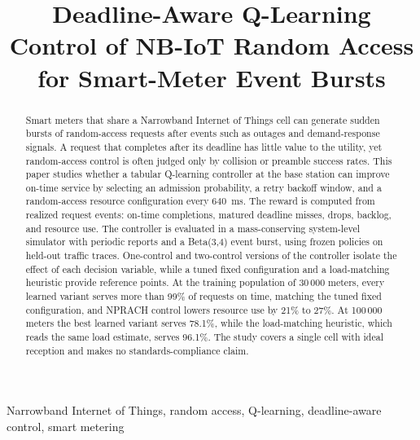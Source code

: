 \documentclass[conference]{IEEEtran}
\newif\ifblind
\begin{document}
\title{Deadline-Aware Q-Learning Control of NB-IoT Random Access for
Smart-Meter Event Bursts}

\ifblind
\author{}
\else
\author{
}
\fi

\maketitle

\begin{abstract}
Smart meters that share a Narrowband Internet of Things cell can generate
sudden bursts of random-access requests after events such as outages and
demand-response signals. A request that completes after its deadline has little
value to the utility, yet random-access control is often judged only by
collision or preamble success rates. This paper studies whether a tabular
Q-learning controller at the base station can improve on-time service by
selecting an admission probability, a retry backoff window, and a
random-access resource configuration every 640~ms. The reward is computed from
realized request events: on-time completions, matured deadline misses, drops,
backlog, and resource use. The controller is evaluated in a mass-conserving
system-level simulator with periodic reports and a Beta(3,4) event burst, using
frozen policies on held-out traffic traces. One-control and two-control versions
of the controller isolate the effect of each decision variable, while a tuned
fixed configuration and a load-matching heuristic provide reference points.
At the training population of 30\,000 meters, every learned variant serves more
than 99\% of requests on time, matching the tuned fixed configuration, and NPRACH
control lowers resource use by 21\% to 27\%. At 100\,000 meters the best
learned variant serves 78.1\%, while the load-matching heuristic, which reads the
same load estimate, serves 96.1\%. The study covers a single cell with ideal reception and makes no
standards-compliance claim.
\end{abstract}

\begin{IEEEkeywords}
Narrowband Internet of Things, random access, Q-learning, deadline-aware
control, smart metering
\end{IEEEkeywords}
\end{document}
